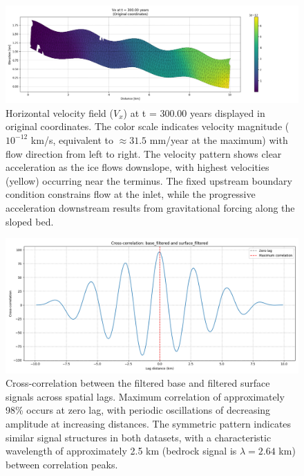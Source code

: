 \begin{figure}
    \includegraphics[scale=0.45]{Vx_300yrs_xz.png}
    \caption{Horizontal velocity field ($V_x$) at t = 300.00 years displayed in original coordinates. The color scale indicates velocity magnitude ($10^{-12}$ km/s, equivalent to $\approx 31.5$ mm/year at the maximum) with flow direction from left to right. The velocity pattern shows clear acceleration as the ice flows downslope, with highest velocities (yellow) occurring near the terminus. The fixed upstream boundary condition  constrains flow at the inlet, while the progressive acceleration downstream results from gravitational forcing along the sloped bed.}
    \label{fig:Vx}
\end{figure}

\begin{figure}
    \includegraphics[scale=0.5]{xcorr_filtered.png}
    \caption{Cross-correlation between the filtered base and filtered surface signals across spatial lags. Maximum correlation of approximately 98\% occurs at zero lag, with periodic oscillations of decreasing amplitude at increasing distances. The symmetric pattern indicates similar signal structures in both datasets, with a characteristic wavelength of approximately 2.5 km (bedrock signal is $\lambda = 2.64$ km) between correlation peaks.}
    \label{fig:xcorr_filtered}
\end{figure}

